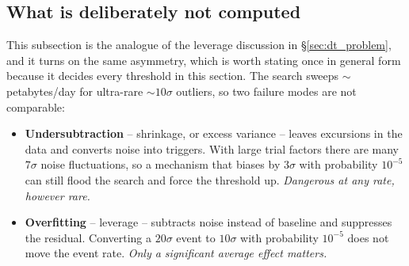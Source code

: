 \documentclass{article}
\numberwithin{equation}{section}   %
\begin{document}
\subsection{What is deliberately not computed}
\label{sec:sd_omitted}

This subsection is the analogue of the leverage discussion in \S\ref{sec:dt_problem}, and it turns on the same
asymmetry, which is worth stating once in general form because it decides every threshold in this section.
The search sweeps $\sim$petabytes/day for ultra-rare $\sim\!10\sigma$ outliers, so two failure modes are not
comparable:
\begin{itemize}
\item {\bf Undersubtraction} -- shrinkage, or excess variance -- leaves excursions in the data and converts
noise into triggers.  With large trial factors there are many $7\sigma$ noise fluctuations, so a mechanism that
biases by $3\sigma$ with probability $10^{-5}$ can still flood the search and force the threshold up.
{\em Dangerous at any rate, however rare.}
\item {\bf Overfitting} -- leverage -- subtracts noise instead of baseline and suppresses the residual.
Converting a $20\sigma$ event to $10\sigma$ with probability $10^{-5}$ does not move the event rate.
{\em Only a significant average effect matters.}
\end{itemize}
\end{document}

